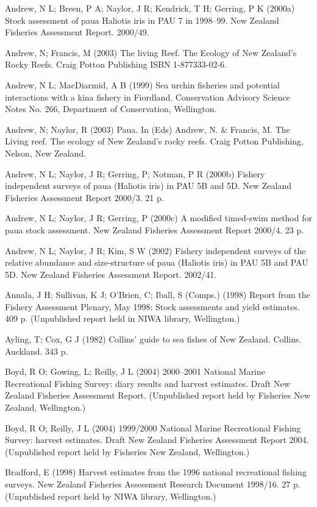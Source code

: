 \documentclass{mpi-plenary}
\theoremstyle{definition}
\theoremstyle{definition}
\theoremstyle{definition}
\theoremstyle{remark}
\begin{document}
Andrew, N L; Breen, P A; Naylor, J R; Kendrick, T H; Gerring, P K
(2000a) Stock assessment of paua Haliotis iris in PAU 7 in 1998--99. New
Zealand Fisheries Assessment Report. 2000/49.

Andrew, N; Francis, M (2003) The living Reef. The Ecology of New
Zealand's Rocky Reefs. Craig Potton Publishing ISBN 1-877333-02-6.

Andrew, N L; MacDiarmid, A B (1999) Sea urchin fisheries and potential
interactions with a kina fishery in Fiordland. Conservation Advisory
Science Notes No. 266, Department of Conservation, Wellington.

Andrew, N; Naylor, R (2003) Paua. In (Eds) Andrew, N. \& Francis, M. The
Living reef. The ecology of New Zealand's rocky reefs. Craig Potton
Publishing, Nelson, New Zealand.

Andrew, N L; Naylor, J R; Gerring, P; Notman, P R (2000b) Fishery
independent surveys of paua (Haliotis iris) in PAU 5B and 5D. New
Zealand Fisheries Assessment Report 2000/3. 21 p.

Andrew, N L; Naylor, J R; Gerring, P (2000c) A modified timed-swim
method for paua stock assessment. New Zealand Fisheries Assessment
Report 2000/4. 23 p.

Andrew, N L; Naylor, J R; Kim, S W (2002) Fishery independent surveys of
the relative abundance and size-structure of paua (Haliotis iris) in PAU
5B and PAU 5D. New Zealand Fisheries Assessment Report. 2002/41.

Annala, J H; Sullivan, K J; O'Brien, C; Iball, S (Comps.) (1998) Report
from the Fishery Assessment Plenary, May 1998: Stock assessments and
yield estimates. 409 p. (Unpublished report held in NIWA library,
Wellington.)

Ayling, T; Cox, G J (1982) Collins' guide to sea fishes of New Zealand.
Collins. Auckland. 343 p.

Boyd, R O; Gowing, L; Reilly, J L (2004) 2000--2001 National Marine
Recreational Fishing Survey: diary results and harvest estimates. Draft
New Zealand Fisheries Assessment Report. (Unpublished report held by
Fisheries New Zealand, Wellington.)

Boyd, R O; Reilly, J L (2004) 1999/2000 National Marine Recreational
Fishing Survey: harvest estimates. Draft New Zealand Fisheries
Assessment Report 2004. (Unpublished report held by Fisheries New
Zealand, Wellington.)

Bradford, E (1998) Harvest estimates from the 1996 national recreational
fishing surveys. New Zealand Fisheries Assessment Research Document
1998/16. 27 p. (Unpublished report held by NIWA library, Wellington.)
\end{document}
